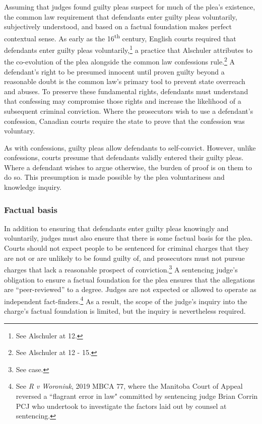Assuming that judges found guilty pleas suspect for much of the plea's existence, the common law requirement that defendants enter guilty pleas voluntarily, subjectively understood, and based on a factual foundation makes perfect contextual sense. As early as the 16\textsuperscript{th} century, English courts required that defendants enter guilty pleas voluntarily,\footnote{See Alschuler at 12.} a practice that Alschuler attributes to the co-evolution of the plea alongside the common law confessions rule.\footnote{See Alschuler at 12 - 15.} A defendant's right to be presumed innocent until proven guilty beyond a reasonable doubt is the common law's primary tool to prevent state overreach and abuses. To preserve these fundamental rights, defendants must understand that confessing may compromise those rights and increase the likelihood of a subsequent criminal conviction. Where the prosecutors wish to use a defendant's confession, Canadian courts require the state to prove that the confession was voluntary. 

As with confessions, guilty pleas allow defendants to self-convict. However, unlike confessions, courts presume that defendants validly entered their guilty pleas. Where a defendant wishes to argue otherwise, the burden of proof is on them to do so. This presumption is made possible by the plea voluntariness and knowledge inquiry.

\subsubsection{Factual basis}

In addition to ensuring that defendants enter guilty pleas knowingly and voluntarily, judges must also ensure that there is some factual basis for the plea. Courts should not expect people to be sentenced for criminal charges that they are not or are unlikely to be found guilty of, and prosecutors must not pursue charges that lack a reasonable prospect of conviction.\footnote{See case.} A sentencing judge's obligation to ensure a factual foundation for the plea ensures that the allegations are ``peer-reviewed'' to a degree. Judges are not expected or allowed to operate as independent fact-finders.\footnote{See \textit{R v Woroniuk}, 2019 MBCA 77, where the Manitoba Court of Appeal reversed a ``flagrant error in law" committed by sentencing judge Brian Corrin PCJ who undertook to investigate the factors laid out by counsel at sentencing.} As a result, the scope of the judge's inquiry into the charge's factual foundation is limited, but the inquiry is nevertheless required.


